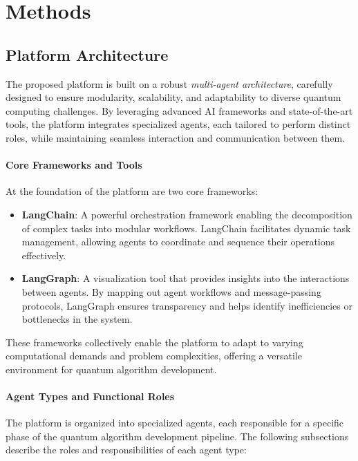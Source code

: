 \documentclass[12pt]{article}
\begin{document}
\section{Methods}
\subsection{Platform Architecture}
The proposed platform is built on a robust \textit{multi-agent architecture}, carefully designed to ensure modularity, scalability, and adaptability to diverse quantum computing challenges. By leveraging advanced AI frameworks and state-of-the-art tools, the platform integrates specialized agents, each tailored to perform distinct roles, while maintaining seamless interaction and communication between them.

\paragraph{Core Frameworks and Tools}
At the foundation of the platform are two core frameworks:
\begin{itemize}
    \item \textbf{LangChain}: A powerful orchestration framework enabling the decomposition of complex tasks into modular workflows. LangChain facilitates dynamic task management, allowing agents to coordinate and sequence their operations effectively.
    \item \textbf{LangGraph}: A visualization tool that provides insights into the interactions between agents. By mapping out agent workflows and message-passing protocols, LangGraph ensures transparency and helps identify inefficiencies or bottlenecks in the system.
\end{itemize}

These frameworks collectively enable the platform to adapt to varying computational demands and problem complexities, offering a versatile environment for quantum algorithm development.

\paragraph{Agent Types and Functional Roles}
The platform is organized into specialized agents, each responsible for a specific phase of the quantum algorithm development pipeline. The following subsections describe the roles and responsibilities of each agent type:
\end{document}
